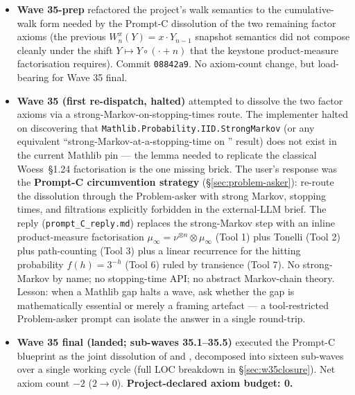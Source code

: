 \documentclass[11pt,a4paper]{article}
\theoremstyle{plain}
\theoremstyle{definition}
\begin{document}
\begin{itemize}[leftmargin=1.5em]
      and the Busemann-at-sister-vertices step (Lemmas A, B, C, D
      in commits \texttt{40217b9}, \texttt{1777ce2},
      \texttt{43a3f70}, \texttt{2a6f53b}) are assembled. Wave 34-final
      v2 carried out that assembly in four micro-steps, dissolved
      the axiom in step~4, and verified that the depth-$p$ inductive
      step's ``outside contribution cancels'' algebraically because
      it depends only on the parent cylinder. Net axiom count $-1$
      ($3 \to 2$). Lesson: ``partial dissolution'' labels deserve
      audit before the next wave; the partial scope sometimes
      reflects intra-wave caution, not a real obstacle.
\item \textbf{Wave 35-prep} refactored the project's walk semantics
      to the cumulative-walk form needed by the Prompt-C dissolution
      of the two remaining factor axioms (the previous
      $W_{n}^{x}(Y) = x \cdot Y_{n-1}$ snapshot semantics did not
      compose cleanly under the shift $Y \mapsto Y \circ (\cdot + n)$
      that the keystone product-measure factorisation requires).
      Commit \texttt{08842a9}. No axiom-count change, but
      load-bearing for Wave 35 final.
\item \textbf{Wave 35 (first re-dispatch, halted)} attempted to
      dissolve the two factor axioms via a strong-Markov-on-stopping-times
      route. The implementer halted on discovering that
      \texttt{Mathlib.Probability.IID.StrongMarkov}
      (or any equivalent ``strong-Markov-at-a-stopping-time on
      '' result) does not exist in the
      current Mathlib pin --- the lemma needed to replicate the
      classical Woess~\S1.24 factorisation is the one missing
      brick. The user's response was the \textbf{Prompt-C
      circumvention strategy} (\S\ref{sec:problem-asker}): re-route
      the dissolution through the Problem-asker with strong Markov,
      stopping times, and filtrations explicitly forbidden in the
      external-LLM brief. The reply (\texttt{prompt\_C\_reply.md})
      replaces the strong-Markov step with an inline product-measure
      factorisation $\mu_\infty = \nu^{\otimes n} \otimes \mu_\infty$
      (Tool 1) plus Tonelli (Tool 2) plus path-counting
      (Tool 3) plus a linear recurrence for the hitting probability
      $f(h) = 3^{-h}$ (Tool 6) ruled by transience (Tool 7). No
      strong-Markov by name; no stopping-time API; no abstract
      Markov-chain theory. Lesson: when a Mathlib gap halts a wave,
      ask whether the gap is mathematically essential or merely a
      framing artefact --- a tool-restricted Problem-asker prompt
      can isolate the answer in a single round-trip.
\item \textbf{Wave 35 final (landed; sub-waves 35.1--35.5)}
      executed the Prompt-C blueprint as the joint dissolution of
       and
      ,
      decomposed into sixteen sub-waves over a single working
      cycle (full LOC breakdown in \S\ref{sec:w35closure}). Net
      axiom count $-2$ ($2 \to 0$). \textbf{Project-declared axiom
      budget: 0.}
\end{itemize}
\end{document}
